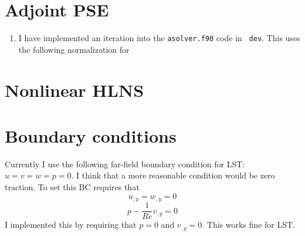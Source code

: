 \documentclass[12pt]{article}
\begin{document}
\section{Adjoint PSE}

\begin{enumerate}
\item I have implemented an iteration into the {\tt asolver.f90} code in {\tt
dev}.  This uses the following normalization for 
\end{enumerate}

\section{Nonlinear HLNS}

\section{Boundary conditions}

Currently I use the following far-field boundary condition for LST:
$u=v=w=p=0$.  I think that a more reasonable condition would be zero traction.
To set this BC requires that 
\[ u_{,y} = w_{,y} = 0 \]
\[ p - \frac{1}{Re} v_{,y} = 0 \]   
I implemented this by requiring that $p = 0$ and $v_{,y}=0$.  This works fine
for LST.
\end{document}
